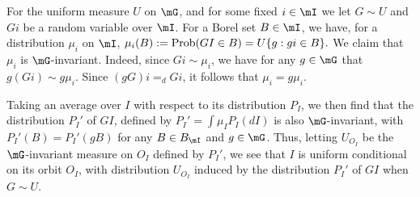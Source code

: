 \documentclass[english]{article}
\begin{document}
For the uniform measure $U$ on $\mG$, 
and for some fixed $i\in \mI$
we let $G \sim U$ and $Gi$ be a random variable over $\mI$.
For a Borel set $B \in \mI$, 
we have,
for a distribution $\mu_i$ on $\mI$,
$
\mu_i(B):= \textnormal{Prob}(GI \in B) = U\{g:gi \in B\}.
$
We claim that $\mu_i$ is $\mG$-invariant.
Indeed, since $Gi\sim\mu_i$, we have for any $g \in \mG$
    that
    $g(Gi)\sim g\mu_i$.
    Since
    $(gG)i =_d Gi$,
    it follows that $\mu_i = g \mu_i$.

Taking an average over $I$
with respect to its distribution $P_I$,
we then find
that 
the distribution 
$P_I'$ of $GI$, defined by 
$
    P_I' = \int \mu_I P_I(dI)
$
is also $\mG$-invariant,
with 
$P_I'(B) = P_I'(gB)$ 
for any $B \in B_\mI$ and $g \in \mG$.
Thus,
letting $U_{O_I}$ be the $\mG$-invariant measure on $O_I$ defined by $P_I'$, 
we see that $I$ is uniform conditional on its orbit $O_I$, 
with distribution $U_{O_I}$ induced by the distribution $P_I'$ of $GI$ when $G \sim U$. 
\end{document}

